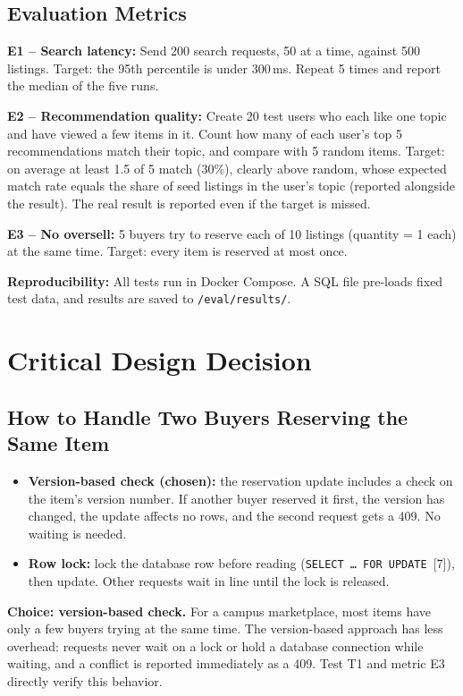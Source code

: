 \documentclass[11pt]{article}
\begin{document}
\subsection*{Evaluation Metrics}
\textbf{E1 -- Search latency:} Send 200 search requests, 50 at a time, against 500 listings.
Target: the 95th percentile is under 300\,ms. Repeat 5 times and report the median of the five runs.

\textbf{E2 -- Recommendation quality:} Create 20 test users who each like one topic and have
viewed a few items in it. Count how many of each user's top 5 recommendations match their topic,
and compare with 5 random items. Target: on average at least 1.5 of 5 match (30\%), clearly above
random, whose expected match rate equals the share of seed listings in the user's topic (reported
alongside the result). The real result is reported even if the target is missed.

\textbf{E3 -- No oversell:} 5 buyers try to reserve each of 10 listings (quantity = 1 each) at the same
time. Target: every item is reserved at most once.

\textbf{Reproducibility:} All tests run in Docker Compose. A SQL file pre-loads fixed test data, and
results are saved to \texttt{/eval/results/}.

\section{Critical Design Decision}
\subsection*{How to Handle Two Buyers Reserving the Same Item}
\begin{itemize}
  \item \textbf{Version-based check (chosen):} the reservation update includes a check on the item's
  version number. If another buyer reserved it first, the version has changed, the update affects no
  rows, and the second request gets a 409. No waiting is needed.
  \item \textbf{Row lock:} lock the database row before reading (\texttt{SELECT \ldots{} FOR UPDATE}~[7]),
  then update. Other requests wait in line until the lock is released.
\end{itemize}

\textbf{Choice: version-based check.} For a campus marketplace, most items have only a few buyers
trying at the same time. The version-based approach has less overhead: requests never wait on a lock
or hold a database connection while waiting, and a conflict is reported immediately as a 409. Test T1
and metric E3 directly verify this behavior.
\end{document}
